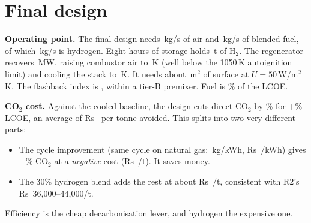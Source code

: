 \documentclass[10.5pt,a4paper]{article}
\newcommand{\Rs}{Rs~}
\begin{document}
\section{Final design}\label{sec:final}
\begin{table}[H]\centering\small\caption{State points of the final design (100\,MW net).}\label{tab:states}

\end{table}
\begin{table}[H]\centering\small\caption{Final design against the baselines and against the same cycle on natural gas only.}\label{tab:perf}

\end{table}
\begin{table}[H]\centering\small\caption{Capital cost of the final design.}\label{tab:capex}

\end{table}
\begin{table}[H]\centering\small\caption{LCOE build-up (hydrogen supply in the fuel line, storage separate).}\label{tab:lcoe}

\end{table}
\textbf{Operating point.} The final design needs \finMair\,kg/s of air and \finMfuel\,kg/s of blended fuel, of which \finMh\,kg/s is hydrogen. Eight hours of storage holds \finStore\,t of H$_2$. The regenerator recovers \finQrg\,MW, raising combustor air to \finTfive\,K (well below the 1050\,K autoignition limit) and cooling the stack to \finTsix\,K. It needs about \finArea\,m$^2$ of surface at $U=50$\,W/m$^2$K. The flashback index is \finFI, within a tier-B premixer. Fuel is \fuelShare\% of the LCOE.

\textbf{CO$_2$ cost.} Against the cooled baseline, the design cuts direct CO$_2$ by \dCOpct\% for +\dLpct\% LCOE, an average of \Rs\abateTot{} per tonne avoided. This splits into two very different parts:
\begin{itemize}[leftmargin=1.2em,itemsep=1pt]
\item The cycle improvement (same cycle on natural gas: \ngCO\,kg/kWh, \Rs\ngLCOE/kWh) gives $-$\dCOcyclepct\% CO$_2$ at a \emph{negative} cost (\Rs\abateCycle/t). It saves money.
\item The 30\% hydrogen blend adds the rest at about \Rs\abateHtwo/t, consistent with R2's \Rs36,000--44,000/t.
\end{itemize}
Efficiency is the cheap decarbonisation lever, and hydrogen the expensive one.

\end{document}
